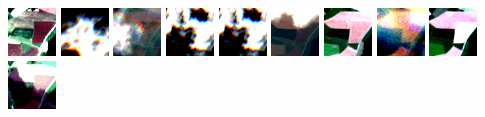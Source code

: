 \documentclass[%
  aspectratio=169,
  9pt,
ngerman,
  light,
  mathserif,
  professionalfont,
  affiliationintitlepagehead,
  titlegraphic,
   affiliation,
   navigationbar,
  progressbar,
]{beamer}
\begin{document}
\begin{frame}
	\includegraphics[width=\imagewidth]{images/activations/16494/x/x-21.png}
	\includegraphics[width=\imagewidth]{images/activations/16494/x/x-22.png}
	\includegraphics[width=\imagewidth]{images/activations/16494/x/x-23.png}
	\includegraphics[width=\imagewidth]{images/activations/16494/x/x-24.png}
	\includegraphics[width=\imagewidth]{images/activations/16494/x/x-25.png}
	\includegraphics[width=\imagewidth]{images/activations/16494/x/x-26.png}
	\includegraphics[width=\imagewidth]{images/activations/16494/x/x-27.png}
	\includegraphics[width=\imagewidth]{images/activations/16494/x/x-28.png}
	\includegraphics[width=\imagewidth]{images/activations/16494/x/x-29.png}
	\includegraphics[width=\imagewidth]{images/activations/16494/x/x-30.png}

\end{frame}
\end{document}
